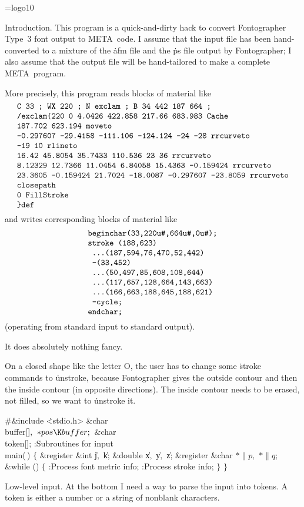 
\datethis
\font\logo=logo10
\def\MF{{\logo META}\-{\logo FONT}}


Introduction. This program is a quick-and-dirty hack to convert
Fontographer Type~3 font output to \MF\ code. I assume that the input
file has been hand-converted to a mixture of the \.{afm} file and
the \.{ps} file output by Fontographer; I also assume that the output
file will be hand-tailored to make a complete \MF\ program.

More precisely, this program reads blocks of material like
$$\vbox{\halign{\tt#\cr
C 33 ; WX 220 ; N exclam ; B 34 442 187 664 ;\cr
/exclam\char`\{220 0 4.0426 422.858 217.66 683.983 Cache\cr
187.702 623.194 moveto\cr
-0.297607 -29.4158 -111.106 -124.124 -24 -28 rrcurveto\cr
-19 10 rlineto\cr
16.42 45.8054 35.7433 110.536 23 36 rrcurveto\cr
8.12329 12.7366 11.0454 6.84058 15.4363 -0.159424 rrcurveto\cr
23.3605 -0.159424 21.7024 -18.0087 -0.297607 -23.8059 rrcurveto\cr
closepath\cr
0 FillStroke\cr
\char`\}def\cr
}}$$
and writes corresponding blocks of material like
$$\vbox{\halign{\tt#\cr
beginchar(33,220u\char`#,664u\char`#,0u\char`#);\cr
stroke (188,623)\cr
\ ...(187,594,76,470,52,442)\cr
\ --(33,452)\cr
\ ...(50,497,85,608,108,644)\cr
\ ...(117,657,128,664,143,663)\cr
\ ...(166,663,188,645,188,621)\cr
\ --cycle;\cr
endchar;\cr
}}$$
(operating from standard input to standard output).

It does absolutely nothing fancy.

On a closed shape like the letter O, the user has to change some \.{stroke}
commands to \.{unstroke}, because Fontographer gives the outside contour and
then the inside contour (in opposite directions). The inside contour needs
to be erased, not filled, so we want to \.{unstroke} it.

\Y\B\8\#\&{include} \.{<stdio.h>}\6
\&{char} \\{buffer}[]${},{}$ ${}{*}\\{pos}\K\\{buffer};{}$\6
\&{char} \\{token}[];\7
:Subroutines for input\X\7
\\{main}(\,)\1\1\2\2\6
${}\{{}$\1\6
\&{register} \&{int} \|j${},{}$ \|k;\6
\&{double} \|x${},{}$ \|y${},{}$ \|z;\6
\&{register} \&{char} ${}{*}\|p,{}$ ${}{*}\|q;{}$\7
\&{while} ()\5
${}\{{}$\1\6
:Process font metric info\X;\6
:Process stroke info\X;\6
\4${}\}{}$\2\6
\4${}\}{}$\2\par
\fi

Low-level input. At the bottom I need a way to parse the input into
tokens.
A token is either a number or a string of nonblank characters.

